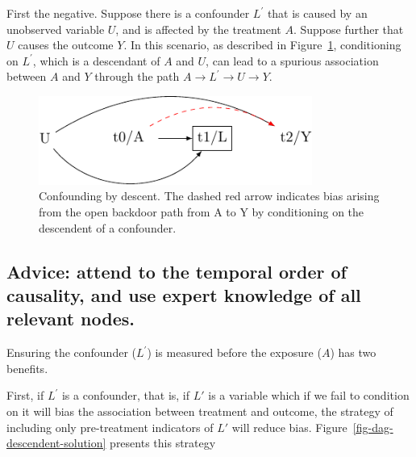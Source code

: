 \documentclass[
  singlecolumn]{report}
\begin{document}
First the negative. Suppose there is a confounder \(L^\prime\) that is
caused by an unobserved variable \(U\), and is affected by the treatment
\(A\). Suppose further that \(U\) causes the outcome \(Y\). In this
scenario, as described in Figure~\ref{fig-dag-descendent}, conditioning
on \(L^\prime\), which is a descendant of \(A\) and \(U\), can lead to a
spurious association between \(A\) and \(Y\) through the path
\(A \to L^\prime \to U \to Y\).

\begin{figure}

{\centering \includegraphics[width=0.8\textwidth,height=\textheight]{causal-dags_files/figure-pdf/fig-dag-descendent-1.pdf}

}

\caption{\label{fig-dag-descendent}Confounding by descent. The dashed
red arrow indicates bias arising from the open backdoor path from A to Y
by conditioning on the descendent of a confounder.}

\end{figure}

\hypertarget{advice-attend-to-the-temporal-order-of-causality-and-use-expert-knowledge-of-all-relevant-nodes.}{%
\subsection{Advice: attend to the temporal order of causality, and use
expert knowledge of all relevant
nodes.}\label{advice-attend-to-the-temporal-order-of-causality-and-use-expert-knowledge-of-all-relevant-nodes.}}

Ensuring the confounder (\(L^\prime\)) is measured before the exposure
(\(A\)) has two benefits.

First, if \(L^\prime\) is a confounder, that is, if \(L\prime\) is a
variable which if we fail to condition on it will bias the association
between treatment and outcome, the strategy of including only
pre-treatment indicators of \(L\prime\) will reduce bias.
Figure~\ref{fig-dag-descendent-solution} presents this strategy
\end{document}
